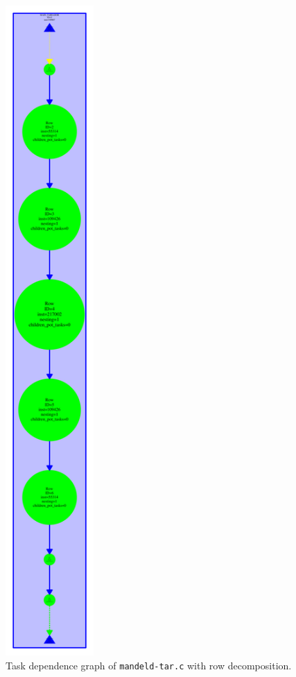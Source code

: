\begin{figure}[H]
\includegraphics[width=0.3\textwidth]{plots/dependency_graph_mandeld_row.pdf}
\caption{Task dependence graph of \texttt{mandeld-tar.c} with row decomposition.}
\label{graph:mandeld_row}
\end{figure}

